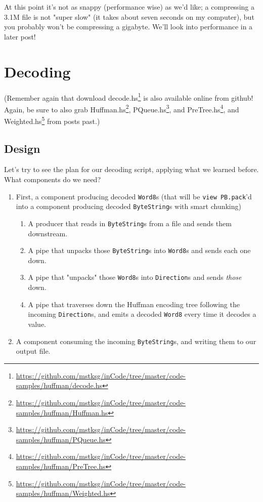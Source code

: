 \documentclass[]{article}
\renewcommand{\href}[2]{#2\footnote{\url{#1}}}
\begin{document}
At this point it's not as snappy (performance wise) as we'd like; a compressing
a 3.1M file is not "super slow" (it takes about seven seconds on my computer),
but you probably won't be compressing a gigabyte. We'll look into performance in
a later post!

\section{Decoding}

(Remember again that download
\href{https://github.com/mstksg/inCode/tree/master/code-samples/huffman/decode.hs}{decode.hs}
is also available online from github! Again, be sure to also grab
\href{https://github.com/mstksg/inCode/tree/master/code-samples/huffman/Huffman.hs}{Huffman.hs},
\href{https://github.com/mstksg/inCode/tree/master/code-samples/huffman/PQueue.hs}{PQueue.hs},
and
\href{https://github.com/mstksg/inCode/tree/master/code-samples/huffman/PreTree.hs}{PreTree.hs},
and
\href{https://github.com/mstksg/inCode/tree/master/code-samples/huffman/Weighted.hs}{Weighted.hs}
from posts past.)

\subsection{Design}

Let's try to see the plan for our decoding script, applying what we learned
before. What components do we need?

\begin{enumerate}
\tightlist
\item
  First, a component producing decoded \texttt{Word8}s (that will be
  \texttt{view\ PB.pack}'d into a component producing decoded
  \texttt{ByteString}s with smart chunking)

  \begin{enumerate}
  \tightlist
  \item
    A producer that reads in \texttt{ByteString}s from a file and sends them
    downstream.
  \item
    A pipe that unpacks those \texttt{ByteString}s into \texttt{Word8}s and
    sends each one down.
  \item
    A pipe that "unpacks" those \texttt{Word8}s into \texttt{Direction}s and
    sends \emph{those} down.
  \item
    A pipe that traverses down the Huffman encoding tree following the incoming
    \texttt{Direction}s, and emits a decoded \texttt{Word8} every time it
    decodes a value.
  \end{enumerate}
\item
  A component consuming the incoming \texttt{ByteString}s, and writing them to
  our output file.
\end{enumerate}
\end{document}

